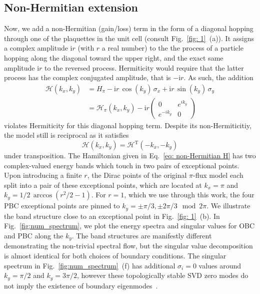 \subsection{Non-Hermitian extension}
Now, we add a non-Hermitian (gain/loss) term in the form of a diagonal hopping through one of the plaquettes in the unit cell (consult Fig.~\ref{fig: 1}~(a)). It assigns a complex amplitude $\mathrm{i} r$ (with $r$ a real number) to the the process of a particle hopping along the diagonal toward the upper right, and the exact same amplitude $\mathrm{i} r$ to the reversed process. Hermiticity would require that the latter process has the complex conjugated amplitude, that is $-\mathrm{i} r$. As such, the addition 
\begin{equation}
\begin{aligned}
\mathcal{H}(k_x,k_y) &= H_\pi - \mathrm{i} r\,\cos(k_y)\, \sigma_x + \mathrm{i} r\,\sin(k_y)\, \sigma_y \\
& = \mathcal{H}_{\pi}(k_x,k_y)
-\mathrm{i}r \begin{pmatrix}
0&e^{ik_y}\\
e^{-ik_y}&0
\end{pmatrix} 
\end{aligned}
\label{eq: non-Hermitian H}
\end{equation}
violates Hermiticity for this diagonal hopping term. Despite its non-Hermiticitiy, the model still is reciprocal as it satisfies
\begin{equation}
\mathcal{H}(k_x, k_y)=\mathcal{H}^{\mathrm{T}}(-k_x,-k_y)
\label{eq:reciprocity}
\end{equation}
under transposition. The Hamiltonian given in Eq.~\eqref{eq: non-Hermitian H} has two complex-valued energy bands which touch in two pairs of exceptional points. Upon introducing a finite $r$, the Dirac points of the original $\pi$-flux model each split into a pair of these exceptional points, which are located at $k_x=\pi$ and $k_y = 1/2 \, \arccos(r^2/2-1)$. For $r=1$, which we use through this work, the four PBC exceptional points are pinned to $k_y = \pm \pi/3, \pm 2 \pi/3 \mod 2\pi$. We illustrate the band structure close to an exceptional point in Fig.~\ref{fig: 1}~(b). In Fig.~\ref{fig:num_spectrum}, we plot the energy spectra and singular values for OBC and PBC along the $k_y$. The band structures are manifestly different demonstrating the non-trivial spectral flow, but the singular value decomposition is almost identical for both choices of boundary conditions. The singular spectrum in Fig.~\ref{fig:num_spectrum}~(f) has additional $\sigma_i = 0$ values around $k_y = \pi / 2$ and $k_y = 3 \pi /2$, however these topologically stable SVD zero modes do not imply the existence of boundary eigenmodes~\cite{SVDHerviou2019}.

